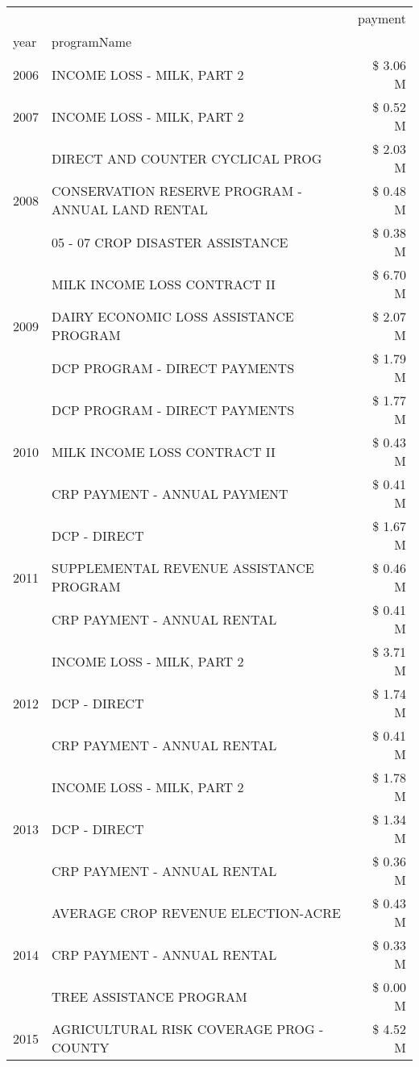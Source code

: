 \begin{tabular}{llr}
\toprule
 &  & payment \\
year & programName &  \\
\midrule
2006 & INCOME LOSS - MILK, PART 2 & \$ 3.06 M \\
\cline{1-3}
2007 & INCOME LOSS - MILK, PART 2 & \$ 0.52 M \\
\cline{1-3}
\multirow[t]{3}{*}{2008} & DIRECT AND COUNTER CYCLICAL PROG & \$ 2.03 M \\
 & CONSERVATION RESERVE PROGRAM - ANNUAL LAND RENTAL & \$ 0.48 M \\
 & 05 - 07 CROP DISASTER ASSISTANCE & \$ 0.38 M \\
\cline{1-3}
\multirow[t]{3}{*}{2009} & MILK INCOME LOSS CONTRACT II & \$ 6.70 M \\
 & DAIRY ECONOMIC LOSS ASSISTANCE PROGRAM & \$ 2.07 M \\
 & DCP PROGRAM - DIRECT PAYMENTS & \$ 1.79 M \\
\cline{1-3}
\multirow[t]{3}{*}{2010} & DCP PROGRAM - DIRECT PAYMENTS & \$ 1.77 M \\
 & MILK INCOME LOSS CONTRACT II & \$ 0.43 M \\
 & CRP PAYMENT - ANNUAL PAYMENT & \$ 0.41 M \\
\cline{1-3}
\multirow[t]{3}{*}{2011} & DCP - DIRECT & \$ 1.67 M \\
 & SUPPLEMENTAL REVENUE ASSISTANCE PROGRAM & \$ 0.46 M \\
 & CRP PAYMENT - ANNUAL RENTAL & \$ 0.41 M \\
\cline{1-3}
\multirow[t]{3}{*}{2012} & INCOME LOSS - MILK, PART 2 & \$ 3.71 M \\
 & DCP - DIRECT & \$ 1.74 M \\
 & CRP PAYMENT - ANNUAL RENTAL & \$ 0.41 M \\
\cline{1-3}
\multirow[t]{3}{*}{2013} & INCOME LOSS - MILK, PART 2 & \$ 1.78 M \\
 & DCP - DIRECT & \$ 1.34 M \\
 & CRP PAYMENT - ANNUAL RENTAL & \$ 0.36 M \\
\cline{1-3}
\multirow[t]{3}{*}{2014} & AVERAGE CROP REVENUE ELECTION-ACRE & \$ 0.43 M \\
 & CRP PAYMENT - ANNUAL RENTAL & \$ 0.33 M \\
 & TREE ASSISTANCE PROGRAM & \$ 0.00 M \\
\cline{1-3}
\multirow[t]{3}{*}{2015} & AGRICULTURAL RISK COVERAGE PROG - COUNTY & \$ 4.52 M \\

\end{tabular}

